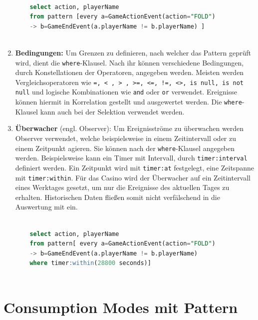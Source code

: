 \begin{enumerate}
	\begin{lstlisting}[caption={Pattern mit Follow-Operator },label=follow_pattern,captionpos=b,language=SQL]
	
	select action, playerName 
	from pattern [every a=GameActionEvent(action="FOLD") 
	-> b=GameEndEvent(a.playerName != b.playerName) ]
	
	\end{lstlisting}
	
	\item \textbf{Bedingungen:}
	Um Grenzen zu definieren, nach welcher das Pattern geprüft wird, dient die \texttt{where}-Klausel. Nach ihr können verschiedene Bedingungen, durch Konstellationen der Operatoren, angegeben werden.
	Meisten werden Vergleichsoperatoren wie \texttt{=, < , > , >=, <=, !=, <>, is null, is not null} und logische Kombinationen wie \texttt{and} oder \texttt{or} verwendet. Ereignisse können hiermit in Korrelation gestellt und ausgewertet werden. Die \texttt{where}- Klausel kann auch bei der Selektion verwendet werden.
	
	\item \textbf{Überwacher} (engl. Observer):
	Um Ereignisströme zu überwachen werden Observer verwendet, welche beispielsweise in einem Zeitintervall oder zu einem Zeitpunkt agieren. Sie können nach der \texttt{where}-Klausel angegeben werden. Beispielsweise kann ein Timer mit Intervall, durch \texttt{timer:interval} definiert werden. Ein Zeitpunkt wird mit \texttt{timer:at} festgelegt, eine Zeitspanne mit \texttt{timer:within}. Für das Casino wird der Überwacher auf ein Zeitintervall eines Werktages gesetzt, um nur die Ereignisse des aktuellen Tages zu erhalten. Historischen Daten fließen somit nicht verfälschend in die Auswertung mit ein.
	
	\begin{lstlisting}[caption={Pattern mit Observer },label=observer_pattern,captionpos=b,language=SQL]
	
	select action, playerName 
	from pattern[ every a=GameActionEvent(action="FOLD") 
	-> b=GameEndEvent(a.playerName != b.playerName)
	where timer:within(28800 seconds)]
	
	\end{lstlisting}
	
\end{enumerate}

\section{Consumption Modes mit Pattern}

